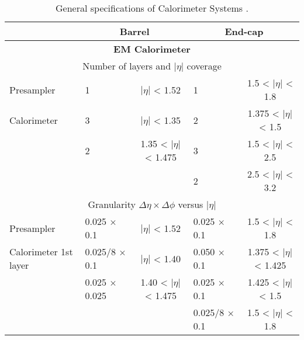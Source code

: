 \begin{table}[] \tiny \centering
\caption{General specifications of Calorimeter Systems \cite{atlas_tdr}.}
\label{tab:cal_specs}
\begin{tabular}{|l|lc|lc|}
\hline 
                                               &                  \multicolumn{2}{c|}{\textbf{Barrel}}            &           \multicolumn{2}{c|}{\textbf{End-cap}}                                 \\
\hline 
                                               \multicolumn{5}{|c|}{\textbf{EM Calorimeter}} \\
\hline 
                                               \multicolumn{5}{|c|}{Number of layers and $|\eta|$ coverage} \\
\hline 
Presampler                                     & 1                 & $|\eta|$ < 1.52                 & 1                               & 1.5 < $|\eta|$ < 1.8     \\
Calorimeter                                    & 3                 & $|\eta|$ < 1.35                 & 2                               & 1.375 < $|\eta|$ < 1.5   \\
                                               & 2                 & 1.35 < $|\eta|$ < 1.475 & 3                                       & 1.5 < $|\eta|$ < 2.5     \\
                                               &                   &                                 & 2                            & 2.5 < $|\eta|$ < 3.2     \\
\hline 
                                               \multicolumn{5}{|c|}{Granularity $\Delta \eta \times \Delta \phi$ versus $|\eta|$} \\
\hline 
Presampler                                     & 0.025 × 0.1       & $|\eta|$ < 1.52                 & 0.025 × 0.1                     & 1.5 < $|\eta|$ < 1.8     \\
Calorimeter 1st layer                          & 0.025/8 × 0.1     & $|\eta|$ < 1.40                 & 0.050 × 0.1                     & 1.375 < $|\eta|$ < 1.425 \\
                                               & 0.025 × 0.025     & 1.40 < $|\eta|$ < 1.475 & 0.025 × 0.1                             & 1.425 < $|\eta|$ < 1.5   \\
                                               &                   &                                    & 0.025/8 × 0.1                   & 1.5 < $|\eta|$ < 1.8     \\

\end{tabular}
\end{table}

